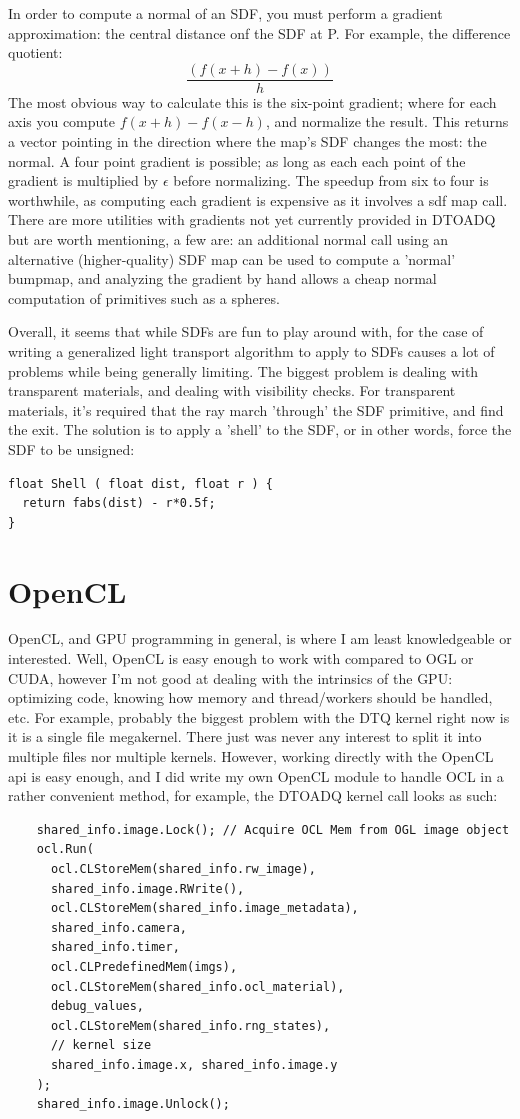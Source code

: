 \message{ !name(test.tex)}\documentclass{article}
\begin{document}
  
  In order to compute a normal of an SDF, you must perform a gradient
approximation: the central distance onf the SDF at P. For example, the
difference quotient:
  \[\frac{(f(x+h) - f(x))}{h}\]
  The most obvious way to calculate this is the six-point gradient; where for
each axis you compute $f(x+h) - f(x-h)$, and normalize the result. This
returns a vector pointing in the direction where the map's SDF changes the
most: the normal. A four point gradient is possible; as long as each each
point of the gradient is multiplied by $\epsilon$ before normalizing. The
speedup from six to four is worthwhile, as computing each gradient is
expensive as it involves a sdf map call. There are more utilities with
gradients not yet currently provided in DTOADQ but are worth mentioning, a
few are: an additional normal call using an alternative (higher-quality) SDF
map can be used to compute a 'normal' bumpmap, and analyzing the gradient by
hand allows a cheap normal computation of primitives such as a spheres.


  Overall, it seems that while SDFs are fun to play around with, for the case of
  writing a generalized light transport algorithm to apply to SDFs causes a lot
  of problems while being generally limiting. The biggest problem is dealing
  with transparent materials, and dealing with visibility checks. For
  transparent materials, it's required that the ray march 'through' the SDF
  primitive, and find the exit. The solution is to apply a 'shell' to the SDF,
  or in other words, force the SDF to be unsigned:

\begin{lstlisting}
float Shell ( float dist, float r ) {
  return fabs(dist) - r*0.5f;
}
\end{lstlisting}
  
  \section{OpenCL}
	OpenCL, and GPU programming in general, is where I am least knowledgeable or
interested. Well, OpenCL is easy enough to work with compared to OGL or CUDA,
however I'm not good at dealing with the intrinsics of the GPU: optimizing code,
knowing how memory and thread/workers should be handled, etc. For example,
probably the biggest problem with the DTQ kernel right now is it is a single
file megakernel. There just was never any interest to split it into multiple
files nor multiple kernels. However, working directly with the OpenCL api is
easy enough, and I did write my own OpenCL module
to handle OCL in a rather convenient method, for example, the DTOADQ kernel call
looks as such:
	\begin{lstlisting}
	shared_info.image.Lock(); // Acquire OCL Mem from OGL image object
	ocl.Run(
	  ocl.CLStoreMem(shared_info.rw_image),
	  shared_info.image.RWrite(),
	  ocl.CLStoreMem(shared_info.image_metadata),
	  shared_info.camera,
	  shared_info.timer,
	  ocl.CLPredefinedMem(imgs),
	  ocl.CLStoreMem(shared_info.ocl_material),
	  debug_values,
	  ocl.CLStoreMem(shared_info.rng_states),
	  // kernel size
	  shared_info.image.x, shared_info.image.y
	);
	shared_info.image.Unlock();
	
	\end{lstlisting}
	
\end{document}
